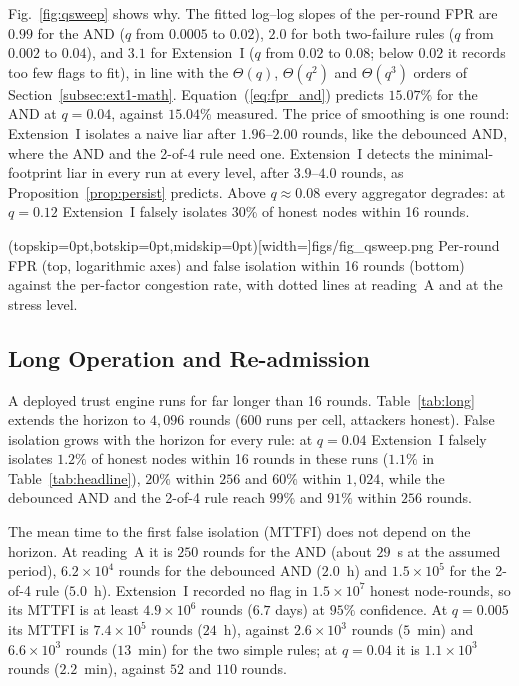 \documentclass{ieeeaccess}
\begin{document}
Fig.~\ref{fig:qsweep} shows why.  The fitted log--log slopes of the
per-round FPR are $0.99$ for the AND ($q$ from $0.0005$ to $0.02$),
$2.0$ for both two-failure rules ($q$ from $0.002$ to $0.04$), and
$3.1$ for Extension~I ($q$ from $0.02$ to $0.08$; below $0.02$ it
records too few flags to fit), in line with the $\Theta(q)$,
$\Theta(q^{2})$ and $\Theta(q^{3})$ orders of
Section~\ref{subsec:ext1-math}.  Equation~(\ref{eq:fpr_and}) predicts
$15.07\%$ for the AND at $q=0.04$, against $15.04\%$ measured.  The
price of smoothing is one round: Extension~I isolates a naive liar after
$1.96$--$2.00$ rounds, like the debounced AND, where the AND and the
2-of-4 rule need one.  Extension~I detects the minimal-footprint liar
in every run at every level, after $3.9$--$4.0$ rounds, as
Proposition~\ref{prop:persist} predicts.  Above $q\approx0.08$ every
aggregator degrades: at $q=0.12$ Extension~I falsely isolates $30\%$
of honest nodes within 16 rounds.

\Figure[!t](topskip=0pt,botskip=0pt,midskip=0pt)[width=\columnwidth]{figs/fig_qsweep.png}
{Per-round FPR (top, logarithmic axes) and false isolation within 16 rounds (bottom) against the per-factor congestion rate, with dotted lines at reading~A and at the stress level.\label{fig:qsweep}}

\subsection{Long Operation and Re-admission}
\label{sec:res-long}
A deployed trust engine runs for far longer than 16 rounds.
Table~\ref{tab:long} extends the horizon to
$4{,}096$ rounds ($600$ runs per cell, attackers honest).  False
isolation grows with the horizon for every rule: at $q=0.04$
Extension~I falsely isolates $1.2\%$ of honest nodes within 16 rounds
in these runs ($1.1\%$ in Table~\ref{tab:headline}), $20\%$ within
$256$ and $60\%$ within $1{,}024$, while the debounced AND and the
2-of-4 rule reach $99\%$ and $91\%$ within $256$ rounds.

The mean time to the first false isolation (MTTFI) does not depend on
the horizon.  At reading~A it is $250$ rounds for the AND (about
$29$~s at the assumed period), $6.2\times10^{4}$ rounds for the
debounced AND ($2.0$~h) and $1.5\times10^{5}$ for the 2-of-4 rule
($5.0$~h).  Extension~I recorded no flag in $1.5\times10^{7}$ honest
node-rounds, so its MTTFI is at least $4.9\times10^{6}$ rounds ($6.7$
days) at $95\%$ confidence.  At $q=0.005$ its MTTFI is
$7.4\times10^{5}$ rounds ($24$~h), against $2.6\times10^{3}$ rounds
($5$~min) and $6.6\times10^{3}$ rounds ($13$~min) for the two simple
rules; at $q=0.04$ it is $1.1\times10^{3}$ rounds ($2.2$~min), against
$52$ and $110$ rounds.
\end{document}
